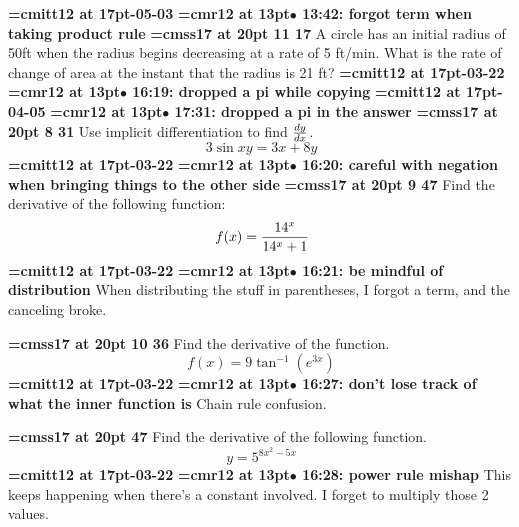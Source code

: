 {\medskip\noindent\bf\font\titlefont=cmitt12 at 17pt-05-03}\medskip
{\smallskip\noindent\bf\font\titlefont=cmr12 at 13pt\titlefont $\bullet$ 13:42: forgot term when taking product rule}\smallskip
{}
{\medskip\noindent\bf\font\titlefont=cmss17 at 20pt 11 17}\medskip
A circle has an initial radius of 50ft when the radius
begins decreasing at a rate of 5 ft/min. What is the rate
of change of area at the instant that the radius is 21 ft?
{\medskip\noindent\bf\font\titlefont=cmitt12 at 17pt-03-22}\medskip
{\smallskip\noindent\bf\font\titlefont=cmr12 at 13pt\titlefont $\bullet$ 16:19: dropped a pi while copying}\smallskip
{\medskip\noindent\bf\font\titlefont=cmitt12 at 17pt-04-05}\medskip
{\smallskip\noindent\bf\font\titlefont=cmr12 at 13pt\titlefont $\bullet$ 17:31: dropped a pi in the answer}\smallskip
{}
{\medskip\noindent\bf\font\titlefont=cmss17 at 20pt 8 31}\medskip
Use implicit differentiation to find ${dy \over dx}$.
$$\
3 \sin xy = 3x + 8y
$$
{\medskip\noindent\bf\font\titlefont=cmitt12 at 17pt-03-22}\medskip
{\smallskip\noindent\bf\font\titlefont=cmr12 at 13pt\titlefont $\bullet$ 16:20: careful with negation when bringing things to the other side}\smallskip
\xrdef{node107}
{\medskip\noindent\bf\font\titlefont=cmss17 at 20pt 9 47}\medskip
Find the derivative of the following function:
$$\
f(x) = {
14^x
\over
{14^x + 1}
}
$$
{\medskip\noindent\bf\font\titlefont=cmitt12 at 17pt-03-22}\medskip
{\smallskip\noindent\bf\font\titlefont=cmr12 at 13pt\titlefont $\bullet$ 16:21: be mindful of distribution}\smallskip
When distributing the stuff in parentheses, I forgot a term, and the canceling broke.
\par

{\medskip\noindent\bf\font\titlefont=cmss17 at 20pt 10 36}\medskip
Find the derivative of the function.
$$\
f(x) = 9\tan^{-1}(e^{3x})
$$
{\medskip\noindent\bf\font\titlefont=cmitt12 at 17pt-03-22}\medskip
{\smallskip\noindent\bf\font\titlefont=cmr12 at 13pt\titlefont $\bullet$ 16:27: don't lose track of what the inner function is}\smallskip
Chain rule confusion.
\par

{\medskip\noindent\bf\font\titlefont=cmss17 at 20pt 47}\medskip
Find the derivative of the following function.
$$\
y = 5^{8x^2 - 5x}
$$
{\medskip\noindent\bf\font\titlefont=cmitt12 at 17pt-03-22}\medskip
{\smallskip\noindent\bf\font\titlefont=cmr12 at 13pt\titlefont $\bullet$ 16:28: power rule mishap}\smallskip
This keeps happening when there's a constant involved. I forget to multiply those 2 values.
\par

